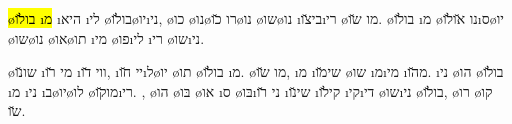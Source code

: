 
\hl{\o{בו}\u{לו} \i{מ}} \i{היא} \i{לי} \o{בו}\u{לו}\o{יו}\i{ני}, \o{כו} \o{נו}\o{רו} \u{כו}\o{נו} \o{שו}\o{נו} \i{בי}\u{צו}\i{רי} \o{מו} \u{שו}. \o{בו}\u{לו} \i{מ} \o{נו}  \u{או}\u{לו}\i{ס}\o{יו} \o{שו}\o{נו}  \o{או}\o{תו} \i{מי} \o{פו}\i{לי}  \i{רי} \o{שו}\i{ני}.

%
{\o{שו}\u{נו}  \i{מי} \u{רו} \i{ווי}}
\u{דו}, \i{יי}   \u{חו}\i{ל}\o{יו}  \o{תו}  \o{בו}\u{לו} \i{מ}.   \o{מו} \u{שו}, \i{מ}  \i{שי}\u{מו}  \o{שו} \i{מ}\i{מי} \i{מ}\u{הו}. \i{ני} \o{הו} \o{בו}\u{לו} \i{מ}  \i{ני}  \i{ב}\o{יו}\o{לו} \o{מו}\u{קו}\i{רי}. ,  \o{הו} \o{בּו} \o{או} \i{ס}  \o{בּו}\i{ני} \u{רו} \i{שי}\u{נו} \i{קי}\u{לו} \i{קי}\i{די} \o{שו}\i{ני}  \o{בו}\u{לו}, \o{רו} \o{קו} \u{שו}.


